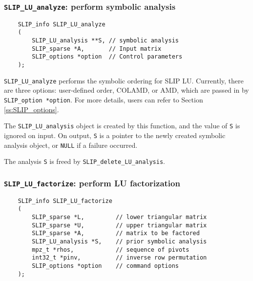 \documentclass[12pt]{article}
\theoremstyle{definition}
\begin{document}
\cprotect\subsubsection{\verb|SLIP_LU_analyze|: perform symbolic analysis}
\label{s:SLIP_LU_analyze}

\begin{mdframed}[userdefinedwidth=6in]
{\footnotesize
\begin{verbatim}
    SLIP_info SLIP_LU_analyze
    (
        SLIP_LU_analysis **S, // symbolic analysis
        SLIP_sparse *A,       // Input matrix
        SLIP_options *option  // Control parameters
    );
\end{verbatim}
} \end{mdframed}

\verb|SLIP_LU_analyze| performs the symbolic ordering for SLIP LU. Currently,
there are three options: user-defined order, COLAMD, or AMD, which are passed
in by \verb|SLIP_option *option|. For more details, users can refer to Section
\ref{ss:SLIP_options}.

The \verb|SLIP_LU_analysis| object is created by this function, and the
value of \verb|S| is ignored on input.  On output, \verb|S| is a pointer to
the newly created symbolic analysis object, or \verb|NULL| if a failure occurred.

The analysis \verb|S| is freed by \verb|SLIP_delete_LU_analysis|.

\cprotect\subsubsection{\verb|SLIP_LU_factorize|: perform LU factorization}
\label{ss:SLIP_LU_factorize}

\begin{mdframed}[userdefinedwidth=6in]
{\footnotesize
\begin{verbatim}
    SLIP_info SLIP_LU_factorize
    (
        SLIP_sparse *L,         // lower triangular matrix
        SLIP_sparse *U,         // upper triangular matrix
        SLIP_sparse *A,         // matrix to be factored
        SLIP_LU_analysis *S,    // prior symbolic analysis
        mpz_t *rhos,            // sequence of pivots
        int32_t *pinv,          // inverse row permutation
        SLIP_options *option    // command options
    );
\end{verbatim}
} \end{mdframed}
\end{document}
